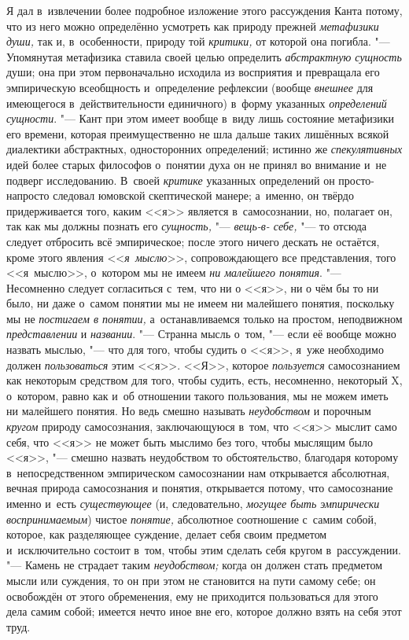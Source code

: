 Я дал в~извлечении более подробное изложение этого рассуждения
Канта потому, что из него можно определённо усмотреть как природу прежней
{\em метафизики души,}
так и, в~особенности, природу той
{\em критики,} от которой
она погибла. "--- Упомянутая метафизика ставила своей целью
определить {\em абстрактную сущность}
души; она при этом первоначально исходила из восприятия и
превращала его эмпирическую всеобщность и~определение рефлексии (вообще
{\em внешнее} для
имеющегося в~действительности единичного) в~форму указанных
{\em определений сущности}. "---
Кант при этом имеет вообще в~виду лишь состояние метафизики
его времени, которая преимущественно не шла дальше таких лишённых всякой
диалектики абстрактных, односторонних определений; истинно же
{\em спекулятивных} идей
более старых философов о~понятии духа он не принял во внимание и~не подверг
исследованию. В~своей {\em критике}
указанных определений он просто-напросто следовал юмовской
скептической манере; а~именно, он твёрдо придерживается того, каким <<я>>
является в~самосознании, но, полагает он, так как мы должны познать его
{\em сущность,} "---
{\em вещь-в- себе,} "--- то
отсюда следует отбросить всё эмпирическое; после этого ничего дескать не
остаётся, кроме этого явления
<<{\em я~мыслю}>>,
сопровождающего все представления, того <<я~мыслю>>, о~котором
мы не имеем {\em ни малейшего понятия}.
"--- Несомненно следует согласиться с~тем, что ни о <<я>>, ни о
чём бы то ни было, ни даже о~самом понятии мы не имеем ни малейшего
понятия, поскольку мы не {\em постигаем
в понятии,} а~останавливаемся только на простом, неподвижном
{\em представлении} и
{\em названии}. "--- Странна
мысль о~том, "--- если её вообще можно назвать мыслью, "---
что для того, чтобы судить о <<я>>, я~уже необходимо должен
{\em пользоваться} этим
<<я>>. <<Я>>, которое {\em пользуется}
самосознанием как некоторым средством для того, чтобы судить,
есть, несомненно, некоторый X, о~котором, равно как и~об отношении такого
пользования, мы не можем иметь ни малейшего понятия. Но ведь смешно
называть {\em неудобством}
и порочным
{\em кругом}
природу самосознания, заключающуюся в~том, что <<я>> мыслит
само себя, что <<я>> не может быть мыслимо без того, чтобы мыслящим было
<<я>>, "--- смешно назвать неудобством то обстоятельство,
благодаря которому в~непосредственном эмпирическом
самосознании нам открывается абсолютная, вечная природа самосознания и
понятия, открывается потому, что самосознание именно и~есть
{\em существующее} (и,
следовательно, {\em могущее быть
эмпирически воспринимаемым}) чистое
{\em понятие,} абсолютное
соотношение с~самим собой, которое, как разделяющее суждение, делает себя
своим предметом и~исключительно состоит в~том, чтобы этим сделать себя
кругом в~рассуждении. "--- Камень не страдает таким
{\em неудобством;} когда
он должен стать предметом мысли или суждения, то он при этом не становится
на пути самому себе; он освобождён от этого обременения, ему не приходится
пользоваться для этого дела самим собой; имеется нечто иное вне его,
которое должно взять на себя этот труд.

